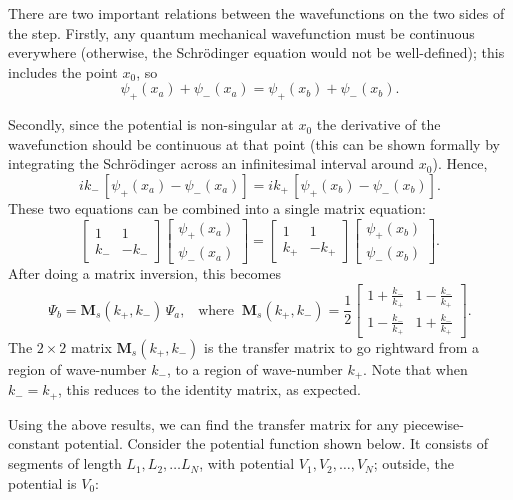 \documentclass[prx,12pt]{revtex4-2}
\begin{document}
There are two important relations between the wavefunctions on the two
sides of the step.  Firstly, any quantum mechanical wavefunction must
be continuous everywhere (otherwise, the Schr\"odinger equation would
not be well-defined); this includes the point $x_0$, so
\begin{equation}
  \psi_+(x_a) + \psi_-(x_a) = \psi_+(x_b) + \psi_-(x_b).
\end{equation}

Secondly, since the potential is non-singular at $x_0$ the derivative
of the wavefunction should be continuous at that point (this can be
shown formally by integrating the Schr\"odinger across an
infinitesimal interval around $x_0$).  Hence,
\begin{equation}
  ik_-\, \left[\psi_+(x_a) - \psi_-(x_a)\right] = ik_+\, \left[\psi_+(x_b) - \psi_-(x_b)\right].
\end{equation}
These two equations can be combined into a single matrix equation:
\begin{equation}
  \begin{bmatrix}1 & 1 \\ k_- & - k_-\end{bmatrix}\begin{bmatrix}\psi_+(x_a) \\ \psi_-(x_a) \end{bmatrix} = \begin{bmatrix}1 & 1 \\ k_+ & - k_+\end{bmatrix} \begin{bmatrix}\psi_+(x_b) \\ \psi_-(x_b) \end{bmatrix}.
\end{equation}
After doing a matrix inversion, this becomes
\begin{equation}
  \Psi_b = \mathbf{M}_s(k_+,k_-) \, \Psi_a, \;\;\;\mathrm{where}\;\; \mathbf{M}_s(k_+,k_-) = \frac{1}{2} \begin{bmatrix}1+\frac{k_-}{k_+} & 1-\frac{k_-}{k_+} \\ 1-\frac{k_-}{k_+} & 1+\frac{k_-}{k_+}\end{bmatrix}.
\end{equation}
The $2\times2$ matrix $\mathbf{M}_s(k_+,k_-)$ is the transfer matrix
to go rightward from a region of wave-number $k_-$, to a region of
wave-number $k_+$.  Note that when $k_- = k_+$, this reduces to the
identity matrix, as expected.

Using the above results, we can find the transfer matrix for any
piecewise-constant potential.  Consider the potential function shown
below.  It consists of segments of length $L_1, L_2, \dots L_N$, with
potential $V_1, V_2, \dots, V_N$; outside, the potential is $V_0$:
\end{document}
